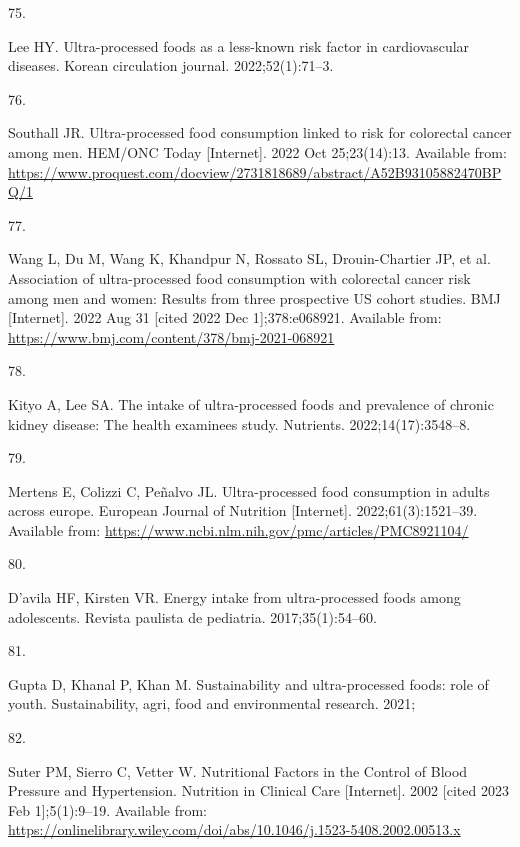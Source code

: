 \documentclass[
]{article}
\newlength{\cslhangindent}
\newlength{\csllabelwidth}
\newlength{\cslentryspacingunit} %
\newenvironment{CSLReferences}[2] %
 {%
  \setlength{\parindent}{0pt}
  \ifodd #1
  \let\oldpar\par
  \def\par{\hangindent=\cslhangindent\oldpar}
  \fi
  \setlength{\parskip}{#2\cslentryspacingunit}
 }%
 {}
\newcommand{\CSLLeftMargin}[1]{\parbox[t]{\csllabelwidth}{#1}}
\newcommand{\CSLRightInline}[1]{\parbox[t]{\linewidth - \csllabelwidth}{#1}\break}
\begin{document}
\begin{CSLReferences}{0}{0}
\leavevmode{}%
\CSLLeftMargin{75. }%
\CSLRightInline{Lee HY. Ultra-processed foods as a less-known risk
factor in cardiovascular diseases. Korean circulation journal.
2022;52(1):71--3. }

\leavevmode{}%
\CSLLeftMargin{76. }%
\CSLRightInline{Southall JR. Ultra-processed food consumption linked to
risk for colorectal cancer among men. HEM/ONC Today {[}Internet{]}. 2022
Oct 25;23(14):13. Available from:
\url{https://www.proquest.com/docview/2731818689/abstract/A52B93105882470BPQ/1}}

\leavevmode{}%
\CSLLeftMargin{77. }%
\CSLRightInline{Wang L, Du M, Wang K, Khandpur N, Rossato SL,
Drouin-Chartier JP, et al. Association of ultra-processed food
consumption with colorectal cancer risk among men and women: Results
from three prospective {US} cohort studies. BMJ {[}Internet{]}. 2022 Aug
31 {[}cited 2022 Dec 1{]};378:e068921. Available from:
\url{https://www.bmj.com/content/378/bmj-2021-068921}}

\leavevmode{}%
\CSLLeftMargin{78. }%
\CSLRightInline{Kityo A, Lee SA. The intake of ultra-processed foods and
prevalence of chronic kidney disease: The health examinees study.
Nutrients. 2022;14(17):3548--8. }

\leavevmode{}%
\CSLLeftMargin{79. }%
\CSLRightInline{Mertens E, Colizzi C, Peñalvo JL. Ultra-processed food
consumption in adults across europe. European Journal of Nutrition
{[}Internet{]}. 2022;61(3):1521--39. Available from:
\url{https://www.ncbi.nlm.nih.gov/pmc/articles/PMC8921104/}}

\leavevmode{}%
\CSLLeftMargin{80. }%
\CSLRightInline{D'avila HF, Kirsten VR. Energy intake from
ultra-processed foods among adolescents. Revista paulista de pediatria.
2017;35(1):54--60. }

\leavevmode{}%
\CSLLeftMargin{81. }%
\CSLRightInline{Gupta D, Khanal P, Khan M. Sustainability and
ultra-processed foods: role of youth. Sustainability, agri, food and
environmental research. 2021; }

\leavevmode{}%
\CSLLeftMargin{82. }%
\CSLRightInline{Suter PM, Sierro C, Vetter W. Nutritional {Factors} in
the {Control} of {Blood Pressure} and {Hypertension}. Nutrition in
Clinical Care {[}Internet{]}. 2002 {[}cited 2023 Feb 1{]};5(1):9--19.
Available from:
\url{https://onlinelibrary.wiley.com/doi/abs/10.1046/j.1523-5408.2002.00513.x}}


\end{CSLReferences}
\end{document}
